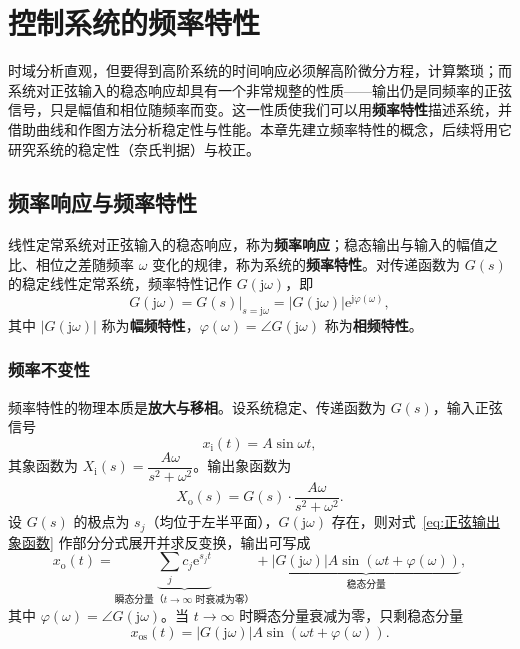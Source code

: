 \chapter{控制系统的频率特性}
\label{sec:控制系统的频率特性}

时域分析直观，但要得到高阶系统的时间响应必须解高阶微分方程，计算繁琐；而系统对正弦输入的稳态响应却具有一个非常规整的性质——输出仍是同频率的正弦信号，只是幅值和相位随频率而变。这一性质使我们可以用\textbf{频率特性}描述系统，并借助曲线和作图方法分析稳定性与性能。本章先建立频率特性的概念，后续将用它研究系统的稳定性（奈氏判据）与校正。

\section{频率响应与频率特性}
\label{sec:频率响应与频率特性}

\begin{definition}[频率响应与频率特性]
线性定常系统对正弦输入的稳态响应，称为\textbf{频率响应}；稳态输出与输入的幅值之比、相位之差随频率 $\omega$ 变化的规律，称为系统的\textbf{频率特性}。对传递函数为 $G(s)$ 的稳定线性定常系统，频率特性记作 $G(\mathrm{j}\omega)$，即
\begin{equation}
G(\mathrm{j}\omega)=G(s)\big|_{s=\mathrm{j}\omega}
=\left|G(\mathrm{j}\omega)\right|\mathrm{e}^{\mathrm{j}\varphi(\omega)},
\label{eq:频率特性}
\end{equation}
其中 $\left|G(\mathrm{j}\omega)\right|$ 称为\textbf{幅频特性}，$\varphi(\omega)=\angle G(\mathrm{j}\omega)$ 称为\textbf{相频特性}。
\end{definition}

\subsection{频率不变性}
\label{sec:频率不变性}

频率特性的物理本质是\textbf{放大与移相}。设系统稳定、传递函数为 $G(s)$，输入正弦信号
\[
x_{\mathrm{i}}(t)=A\sin\omega t,
\]
其象函数为 $X_{\mathrm{i}}(s)=\dfrac{A\omega}{s^{2}+\omega^{2}}$。输出象函数为
\begin{equation}
X_{\mathrm{o}}(s)=G(s)\cdot\frac{A\omega}{s^{2}+\omega^{2}}.
\label{eq:正弦输出象函数}
\end{equation}
设 $G(s)$ 的极点为 $s_{j}$（均位于左半平面），$G(\mathrm{j}\omega)$ 存在，则对式~\eqref{eq:正弦输出象函数} 作部分分式展开并求反变换，输出可写成
\begin{equation}
x_{\mathrm{o}}(t)=\underbrace{\sum_{j}c_{j}\mathrm{e}^{s_{j}t}}_{\text{瞬态分量（}t\to\infty\text{ 时衰减为零）}}
+\underbrace{\left|G(\mathrm{j}\omega)\right|A\sin\left(\omega t+\varphi(\omega)\right)}_{\text{稳态分量}},
\label{eq:正弦全响应}
\end{equation}
其中 $\varphi(\omega)=\angle G(\mathrm{j}\omega)$。当 $t\to\infty$ 时瞬态分量衰减为零，只剩稳态分量
\begin{equation}
x_{\mathrm{os}}(t)=\left|G(\mathrm{j}\omega)\right|A\sin\left(\omega t+\varphi(\omega)\right).
\label{eq:正弦稳态响应}
\end{equation}

